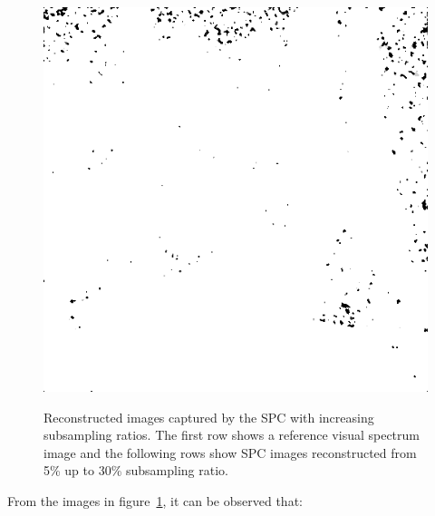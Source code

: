 \begin{figure}[H]
\begin{minipage}[t]{0.3\linewidth}
	\label{fig:hus_m30}
\end{minipage}
\begin{minipage}[t]{0.3\linewidth} %
	\includegraphics[width = 1\linewidth]{gfx/sit/sit_m30.png}
	\label{fig:sit_m30}
\end{minipage}
	\caption{Reconstructed images captured by the SPC with increasing subsampling ratios. The first row shows a reference visual spectrum image and the following rows show SPC images reconstructed from 5\% up to 30\% subsampling ratio.}
	\label{fig:subsampling_ratios}
\end{figure}

From the images in figure~\ref{fig:subsampling_ratios}, it can be observed that:

